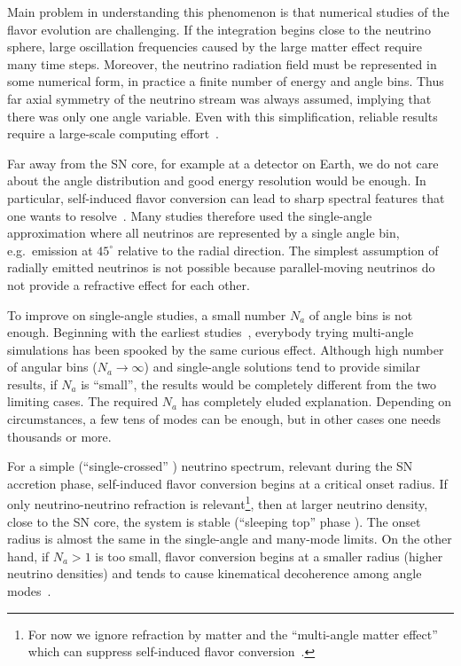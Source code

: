 \documentclass[twocolumn,prd,showpacs,
floatfix,preprintnumbers,nofootinbib]{revtex4}
\begin{document}
Main problem in understanding this phenomenon is that numerical
studies of the flavor evolution are challenging. If the integration
begins close to the neutrino sphere, large oscillation frequencies
caused by the large matter effect require many time steps. Moreover,
the neutrino radiation field must be represented in some numerical
form, in practice a finite number of energy and angle bins. Thus far
axial symmetry of the neutrino stream was always assumed, implying
that there was only one angle variable. Even with this
simplification, reliable results require a large-scale computing
effort~\cite{Duan:2008eb}.

Far away from the SN core, for example at a detector on Earth, we do
not care about the angle distribution and good energy resolution
would be enough. In particular, self-induced flavor conversion can
lead to sharp spectral features that one wants to
resolve~\cite{Duan:2006an, Raffelt:2007cb, Duan:2007fw,
Fogli:2007bk, Dasgupta:2009mg}. Many studies therefore used the
single-angle approximation where all neutrinos are represented by a
single angle bin, e.g.\ emission at $45^\circ$ relative to the
radial direction. The simplest assumption of radially emitted
neutrinos is not possible because parallel-moving neutrinos do not
provide a refractive effect for each other.

To improve on single-angle studies, a small number $N_a$ of angle bins 
is not enough. Beginning with the earliest studies~\cite{Duan:2006an}, 
everybody trying multi-angle simulations has been spooked by the same 
curious effect. Although high number of angular bins ($N_a\to\infty$) 
and single-angle solutions tend to provide similar results, if $N_a$ is 
``small'', the results would be completely different from the two 
limiting cases. The required $N_a$ has
completely eluded explanation. Depending on circumstances, a few
tens of modes can be enough, but in other cases one needs thousands
or more. 

For a simple (``single-crossed'' \cite{Dasgupta:2009mg}) neutrino
spectrum, relevant during the SN accretion phase, self-induced
flavor conversion begins at a critical onset radius.
If only neutrino-neutrino refraction is relevant\footnote{For now we ignore refraction by matter and the ``multi-angle matter effect'' which can suppress self-induced flavor conversion~\cite{Raffelt:2008hr, Duan:2010bf, EstebanPretel:2008ni, Chakraborty:2011gd, Sarikas:2011am}.}, then at larger neutrino
density, close to the SN core, the system is stable (``sleeping top'' phase
\cite{Hannestad:2006nj, Duan:2007mv}). The onset radius is almost
the same in the single-angle and many-mode limits. On the other
hand, if $N_a>1$ is too small, flavor conversion begins at a smaller
radius (higher neutrino densities) and tends to cause kinematical decoherence among angle modes~\cite{EstebanPretel:2007ec}.
\end{document}
